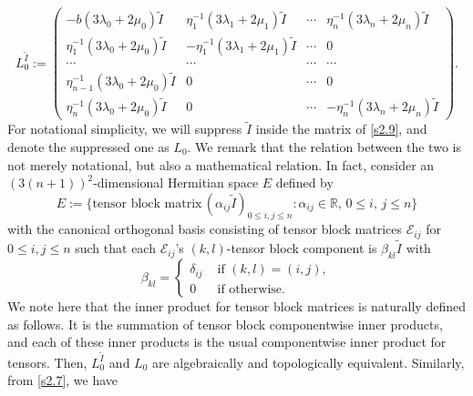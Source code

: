 \documentclass[a4paper,12pt]{article}
\newtheorem{a priori condition}[Th]{A priori condition}
\begin{document}
\begin{equation}\label{s2.9}
L_0^{\tilde I}:=
\begin{pmatrix}
                       -b(3\lambda_0+2\mu_0)\tilde I
                       & \eta_1^{-1}(3\lambda_1+2\mu_1)\tilde I & \cdots               &    \eta_n^{-1}(3\lambda_n+2\mu_n) \tilde I   \\

                             \eta_1^{-1}(3\lambda_0+2\mu_0)\tilde I                              & -\eta_1^{-1}(3\lambda_1+2\mu_1)\tilde I & \cdots                  &            0         \\
            \cdots                                   & \cdots                   & \cdots     & \cdots                            \\
                               \eta_{n-1}^{-1}(3\lambda_0+2\mu_0) \tilde I                               & 0              & \cdots          &            0         \\
                              \eta_n^{-1}(3\lambda_0+2\mu_0)\tilde I                              & 0              & \cdots                    &   -\eta_n^{-1}(3\lambda_n+2\mu_n)\tilde I
\end{pmatrix}.
\end{equation}
\noindent
For notational simplicity, we will suppress $\tilde I$ inside the matrix of \eqref{s2.9}, and denote the suppressed one as $L_0$. We remark that the relation between the two is not merely notational, but also a mathematical relation. In fact, consider an $\left(3(n+1)\right)^2$-dimensional Hermitian space $E$ defined by
$$
E:=\{\text{tensor block matrix}\,(\alpha_{ij}\tilde I)_{0\le i,j\le n}:\alpha_{ij}\in{\mathbb R},\,0\le i,\,j\le n\}
$$
with the canonical orthogonal basis consisting of tensor block matrices $\mathcal{E}_{ij}$ for $0\le i,j\le n$ such that each $\mathcal{E}_{ij}$'s $(k,l)$-tensor block component is $\beta_{kl}\tilde I$ with 
$$
\beta_{kl}=\left\{
\begin{array}{ll}
\delta_{ij}\,\,&\text{if}\,\,(k,l)
=(i,j),\\
0\,\,&\text{if otherwise}.
\end{array}
\right.
$$
We note here that the inner product for tensor block matrices is naturally defined as follows. It is the summation of tensor block componentwise inner products, and each of these inner products is the usual componentwise inner product for tensors. 
Then, $L_0^{\tilde I}$ and $L_0$ are algebraically and topologically equivalent.
Similarly, from \eqref{s2.7}, we have
\end{document}
